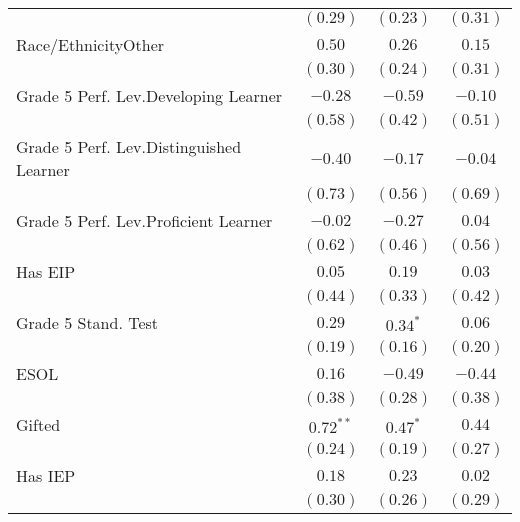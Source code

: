 \begin{center}
\begin{longtable}{l c c c}
                                                   & $(0.29)$     & $(0.23)$     & $(0.31)$     \\
Race/EthnicityOther                                       & $0.50$       & $0.26$       & $0.15$       \\
                                                   & $(0.30)$     & $(0.24)$     & $(0.31)$     \\
Grade 5 Perf. Lev.Developing Learner               & $-0.28$      & $-0.59$      & $-0.10$      \\
                                                   & $(0.58)$     & $(0.42)$     & $(0.51)$     \\
Grade 5 Perf. Lev.Distinguished Learner            & $-0.40$      & $-0.17$      & $-0.04$      \\
                                                   & $(0.73)$     & $(0.56)$     & $(0.69)$     \\
Grade 5 Perf. Lev.Proficient Learner               & $-0.02$      & $-0.27$      & $0.04$       \\
                                                   & $(0.62)$     & $(0.46)$     & $(0.56)$     \\
Has EIP                                                & $0.05$       & $0.19$       & $0.03$       \\
                                                   & $(0.44)$     & $(0.33)$     & $(0.42)$     \\
Grade 5 Stand. Test                                       & $0.29$       & $0.34^{*}$   & $0.06$       \\
                                                   & $(0.19)$     & $(0.16)$     & $(0.20)$     \\
ESOL                                               & $0.16$       & $-0.49$      & $-0.44$      \\
                                                   & $(0.38)$     & $(0.28)$     & $(0.38)$     \\
Gifted                                             & $0.72^{**}$  & $0.47^{*}$   & $0.44$       \\
                                                   & $(0.24)$     & $(0.19)$     & $(0.27)$     \\
Has IEP                                                & $0.18$       & $0.23$       & $0.02$       \\
                                                   & $(0.30)$     & $(0.26)$     & $(0.29)$     \\

\end{longtable}
\end{center}
